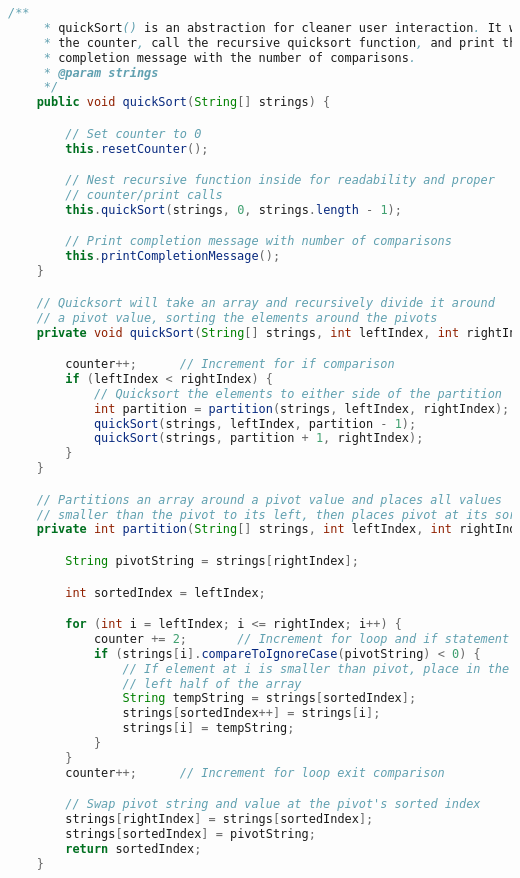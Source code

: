 \documentclass[letterpaper, 10pt]{article}
\begin{document}
\begin{lstlisting}[language=Java, firstnumber=162]
    /**
     * quickSort() is an abstraction for cleaner user interaction. It will reset
     * the counter, call the recursive quicksort function, and print the
     * completion message with the number of comparisons.
     * @param strings
     */
    public void quickSort(String[] strings) {

        // Set counter to 0
        this.resetCounter();

        // Nest recursive function inside for readability and proper
        // counter/print calls
        this.quickSort(strings, 0, strings.length - 1);

        // Print completion message with number of comparisons
        this.printCompletionMessage();
    }

    // Quicksort will take an array and recursively divide it around
    // a pivot value, sorting the elements around the pivots
    private void quickSort(String[] strings, int leftIndex, int rightIndex) {

        counter++;      // Increment for if comparison
        if (leftIndex < rightIndex) {
            // Quicksort the elements to either side of the partition
            int partition = partition(strings, leftIndex, rightIndex);
            quickSort(strings, leftIndex, partition - 1);
            quickSort(strings, partition + 1, rightIndex);
        }
    }

    // Partitions an array around a pivot value and places all values
    // smaller than the pivot to its left, then places pivot at its sorted index
    private int partition(String[] strings, int leftIndex, int rightIndex) {

        String pivotString = strings[rightIndex];

        int sortedIndex = leftIndex;

        for (int i = leftIndex; i <= rightIndex; i++) {
            counter += 2;       // Increment for loop and if statement
            if (strings[i].compareToIgnoreCase(pivotString) < 0) {
                // If element at i is smaller than pivot, place in the
                // left half of the array
                String tempString = strings[sortedIndex];
                strings[sortedIndex++] = strings[i];
                strings[i] = tempString;
            }
        }
        counter++;      // Increment for loop exit comparison

        // Swap pivot string and value at the pivot's sorted index
        strings[rightIndex] = strings[sortedIndex];
        strings[sortedIndex] = pivotString;
        return sortedIndex;
    }
\end{lstlisting}
\end{document}
